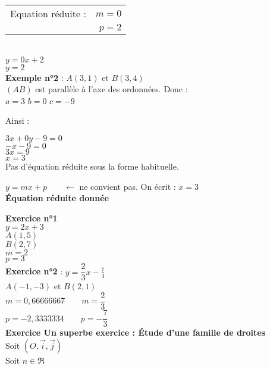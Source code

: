 \begin{tabular}{lr}
Equation réduite : & $m=0$\\
           & $p=2$\\
\end{tabular} \\           

$y=0x+2$\\
$y=2$\\


\textbf{Exemple n°2} : $A(3,1)$ et $B(3,4)$\\

$(AB)$ est parallèle à l'axe des ordonnées. Donc : \\

$a=3$
$b=0$
$c=-9$

Ainsi :

$3x+0y-9 =0$ \\
$-x-9=0$ \\
$3x=9$ \\
$x=3$ \\

Pas d'équation réduite sous la forme habituelle. 

$y=mx+p\qquad \longleftarrow$ ne convient pas. On écrit : $x=3$ \\


\textbf{Équation réduite donnée}

\textbf{Exercice n°1} \\

$y=2x+3$ \\

$A(1,5)$\\
$B(2,7)$\\
$m=2$\\
$p=3$\\

\textbf{Exercice n°2} : $y=\dfrac{2}{3}x-\frac{7}{3}$\\

$A(-1, -3)$ et $B(2,1)$\\

$m=0,66666667 \qquad m=\dfrac{2}{3}$\\
$p=-2,3333334 \qquad p=-\dfrac{7}{3}$\\

\textbf{Exercice  Un superbe exercice : Étude d'une famille de droites} \\

Soit $(O, \vec{i}, \vec{j})$\\

Soit $n \in \Re$\\  

